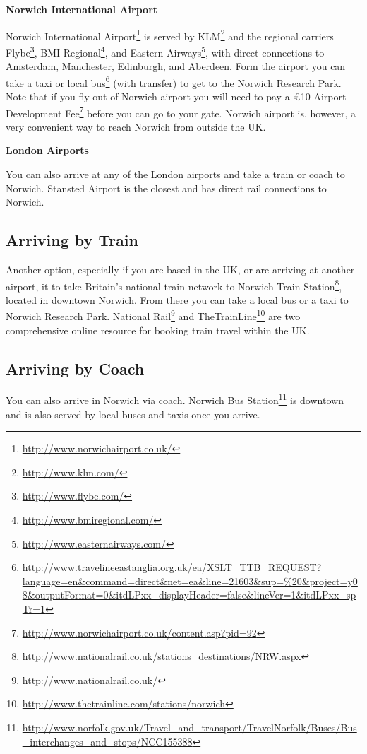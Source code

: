 \documentclass[12pt,]{book}
\let\rmarkdownfootnote\footnote%
\def\footnote{\protect\rmarkdownfootnote}
\renewcommand{\href}[2]{#2\footnote{\url{#1}}}
\begin{document}
\textbf{Norwich International Airport}

\href{http://www.norwichairport.co.uk/}{Norwich International Airport}
is served by \href{http://www.klm.com/}{KLM} and the regional carriers
\href{http://www.flybe.com/}{Flybe},
\href{http://www.bmiregional.com/}{BMI Regional}, and
\href{http://www.easternairways.com/}{Eastern Airways}, with direct
connections to Amsterdam, Manchester, Edinburgh, and Aberdeen. Form the
airport you can take a taxi or
\href{http://www.travelineeastanglia.org.uk/ea/XSLT_TTB_REQUEST?language=en\&command=direct\&net=ea\&line=21603\&sup=\%20\&project=y08\&outputFormat=0\&itdLPxx_displayHeader=false\&lineVer=1\&itdLPxx_spTr=1}{local
bus} (with transfer) to get to the Norwich Research Park. Note that if
you fly out of Norwich airport you will need to pay a
\href{http://www.norwichairport.co.uk/content.asp?pid=92}{£10 Airport
Development Fee} before you can go to your gate. Norwich airport is,
however, a very convenient way to reach Norwich from outside the UK.

\textbf{London Airports}

You can also arrive at any of the London airports and take a train or
coach to Norwich. Stansted Airport is the closest and has direct rail
connections to Norwich.

\subsection*{Arriving by Train}\label{arriving-by-train}

Another option, especially if you are based in the UK, or are arriving
at another airport, it to take Britain's national train network to
\href{http://www.nationalrail.co.uk/stations_destinations/NRW.aspx}{Norwich
Train Station}, located in downtown Norwich. From there you can take a
local bus or a taxi to Norwich Research Park.
\href{http://www.nationalrail.co.uk/}{National Rail} and
\href{http://www.thetrainline.com/stations/norwich}{TheTrainLine} are
two comprehensive online resource for booking train travel within the
UK.

\subsection*{Arriving by Coach}\label{arriving-by-coach}

You can also arrive in Norwich via coach.
\href{http://www.norfolk.gov.uk/Travel_and_transport/TravelNorfolk/Buses/Bus_interchanges_and_stops/NCC155388}{Norwich
Bus Station} is downtown and is also served by local buses and taxis
once you arrive.
\end{document}
